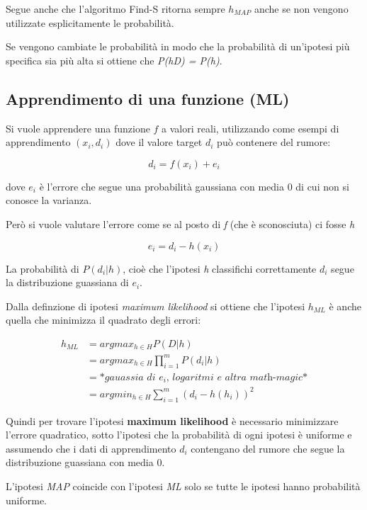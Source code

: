 Segue anche che l'algoritmo Find-S ritorna sempre $h_{MAP}$ anche se non vengono utilizzate esplicitamente le probabilità.

Se vengono cambiate le probabilità in modo che la probabilità di
un'ipotesi più specifica sia più alta si ottiene che
\emph{P(h\textbar{}D) = P(h)}.

\subsection{Apprendimento di una funzione (ML)}\label{apprendimento-di-una-funzione-ml}

Si vuole apprendere una funzione $f$ a valori reali, utilizzando come esempi di apprendimento $(x_i, d_i)$ dove il valore target $d_i$ può contenere del rumore:

$$
d_i = f(x_i) + e_i
$$

dove $e_i$ è l'errore che segue una probabilità gaussiana con media 0 di
cui non si conosce la varianza.

Però si vuole valutare l'errore come se al posto di \emph{f} (che è sconosciuta) ci fosse \emph{h}

$$
e_i = d_i - h(x_i)
$$

La probabilità di $P(d_i | h)$, cioè che l'ipotesi \emph{h}
classifichi correttamente $d_i$ segue la distribuzione guassiana di
$e_i$.

Dalla definzione di ipotesi \textit{maximum likelihood} si ottiene che l'ipotesi $h_{ML}$ è anche quella che minimizza il quadrato degli errori:

\begin{align*}
h_{ML} &= argmax_{h \in H} P(D|h) \\
				&=  argmax_{h \in H} \prod\limits_{i=1}^m P(d_i|h) \\
				&= *\textit{gauassia di } e_i \textit{, logaritmi e altra math-magic*}\\
				&= arg min_{h \in H} \sum\limits_{i = 1}^m (d_i - h(h_i))^2
\end{align*}

Quindi per trovare l'ipotesi \textbf{maximum likelihood} è necessario
minimizzare l'errore quadratico, sotto l'ipotesi che la probabilità di
ogni ipotesi è uniforme e assumendo che i dati di apprendimento $d_i$ contengano del rumore che segue la distribuzione guassiana con media 0.

L'ipotesi \textit{MAP} coincide con l'ipotesi \textit{ML} solo se tutte le ipotesi hanno probabilità uniforme.


